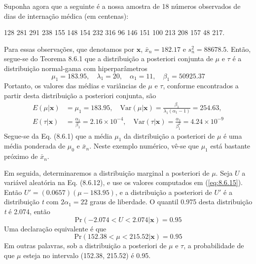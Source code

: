     Suponha agora que a seguinte é a nossa amostra de 18 números observados de dias de internação médica (em centenas):
\begin{center}
        128 281 291 238 155 148 154 232 316 96 146 151 100 213 208 157 48 217.
    \end{center}
    Para essas observações, que denotamos por $\mathbf{x}$, $\bar{x}_n = 182.17$ e $s_n^2 = 88678.5$. Então, segue-se do Teorema 8.6.1 que a distribuição a posteriori conjunta de $\mu$ e $\tau$ é a distribuição normal-gama com hiperparâmetros
    \begin{equation} \label{eq:8.6.15}
        \mu_1 = 183.95, \quad \lambda_1 = 20, \quad \alpha_1 = 11, \quad \beta_1 = 50925.37
    \end{equation}
    Portanto, os valores das médias e variâncias de $\mu$ e $\tau$, conforme encontrados a partir desta distribuição a posteriori conjunta, são
    \begin{equation} \label{eq:8.6.16}
    \begin{split}
        E(\mu|\mathbf{x}) &= \mu_1 = 183.95, \quad \text{Var}(\mu|\mathbf{x}) = \frac{\beta_1}{\lambda_1(\alpha_1 - 1)} = 254.63, \\
        E(\tau|\mathbf{x}) &= \frac{\alpha_1}{\beta_1} = 2.16 \times 10^{-4}, \quad \text{Var}(\tau|\mathbf{x}) = \frac{\alpha_1}{\beta_1^2} = 4.24 \times 10^{-9}
    \end{split}
    \end{equation}
    Segue-se da Eq. (8.6.1) que a média $\mu_1$ da distribuição a posteriori de $\mu$ é uma média ponderada de $\mu_0$ e $\bar{x}_n$. Neste exemplo numérico, vê-se que $\mu_1$ está bastante próximo de $\bar{x}_n$.

    Em seguida, determinaremos a distribuição marginal a posteriori de $\mu$. Seja $U$ a variável aleatória na Eq. (8.6.12), e use os valores computados em (\ref{eq:8.6.15}). Então $U' = (0.0657)(\mu - 183.95)$, e a distribuição a posteriori de $U'$ é a distribuição \textit{t} com $2\alpha_1 = 22$ graus de liberdade. O quantil 0.975 desta distribuição \textit{t} é 2.074, então
    \begin{equation} \label{eq:8.6.17}
        \text{Pr}(-2.074 < U < 2.074|\mathbf{x}) = 0.95
    \end{equation}
    Uma declaração equivalente é que
    \begin{equation} \label{eq:8.6.18}
        \text{Pr}(152.38 < \mu < 215.52|\mathbf{x}) = 0.95
    \end{equation}
    Em outras palavras, sob a distribuição a posteriori de $\mu$ e $\tau$, a probabilidade de que $\mu$ esteja no intervalo (152.38, 215.52) é 0.95.

